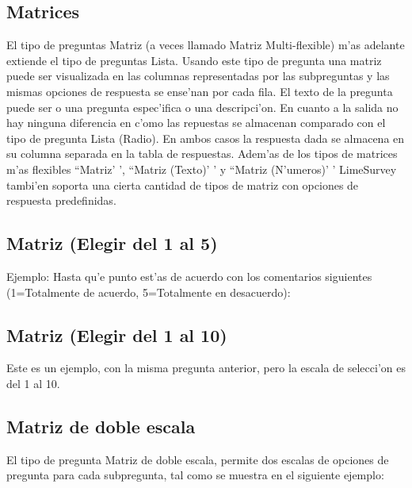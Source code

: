 \documentclass[12pt,spanish]{report}
\begin{document}
\subsection {Matrices}
El tipo de preguntas Matriz (a veces llamado Matriz Multi-flexible) m'as adelante extiende el tipo de preguntas Lista. Usando este tipo de pregunta una matriz puede ser visualizada en las columnas representadas por las subpreguntas y las mismas opciones de respuesta se ense'nan por cada fila. El texto de la pregunta puede ser o una pregunta espec'ifica o una descripci'on.
En cuanto a la salida no hay ninguna diferencia en c'omo las repuestas se almacenan comparado con el tipo de pregunta Lista (Radio). En ambos casos la respuesta dada se almacena en su columna separada en la tabla de respuestas.
Adem'as de los tipos de matrices m'as flexibles ``Matriz' ', ``Matriz (Texto)' ' y ``Matriz (N'umeros)' ' LimeSurvey tambi'en soporta una cierta cantidad de tipos de matriz con opciones de respuesta predefinidas.

\subsection{Matriz (Elegir del 1 al 5)}
Ejemplo: Hasta qu'e punto est'as de acuerdo con los comentarios siguientes (1=Totalmente de acuerdo, 5=Totalmente en desacuerdo):\\
\par
\centerline{\hbox{}}
\par


\subsection {Matriz (Elegir del 1 al 10)}
Este es un ejemplo, con la misma pregunta anterior, pero la escala de selecci'on es del 1 al 10.\\
\par
\centerline{\hbox{}}
\par 

\newpage
\subsection{Matriz de doble escala}

El tipo de pregunta Matriz de doble escala, permite dos escalas de opciones de pregunta para cada subpregunta, tal como se muestra en el siguiente ejemplo:\\
\par
\centerline{\hbox{}}
\par
\end{document}
